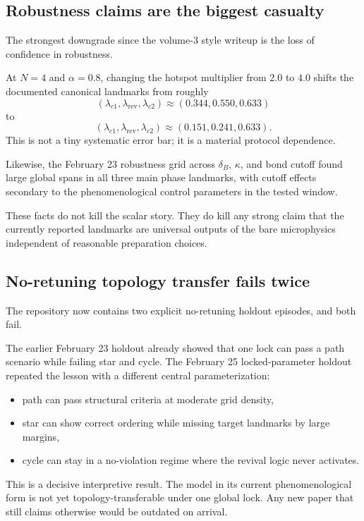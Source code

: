 \documentclass[11pt]{article}
\begin{document}
\subsection{Robustness claims are the biggest casualty}

The strongest downgrade since the volume-3 style writeup is the loss of confidence in robustness.

At $N=4$ and $\alpha=0.8$, changing the hotspot multiplier from $2.0$ to $4.0$ shifts the documented canonical landmarks from roughly
\[
(\lambda_{c1},\lambda_{\mathrm{rev}},\lambda_{c2})
\approx
(0.344,0.550,0.633)
\]
to
\[
(\lambda_{c1},\lambda_{\mathrm{rev}},\lambda_{c2})
\approx
(0.151,0.241,0.633).
\]
This is not a tiny systematic error bar; it is a material protocol dependence.

Likewise, the February 23 robustness grid across $\delta_B$, $\kappa$, and bond cutoff found large global spans in all three main phase landmarks, with cutoff effects secondary to the phenomenological control parameters in the tested window.

These facts do not kill the scalar story. They do kill any strong claim that the currently reported landmarks are universal outputs of the bare microphysics independent of reasonable preparation choices.

\subsection{No-retuning topology transfer fails twice}

The repository now contains two explicit no-retuning holdout episodes, and both fail.

The earlier February 23 holdout already showed that one lock can pass a path scenario while failing star and cycle. The February 25 locked-parameter holdout repeated the lesson with a different central parameterization:
\begin{itemize}
    \item path can pass structural criteria at moderate grid density,
    \item star can show correct ordering while missing target landmarks by large margins,
    \item cycle can stay in a no-violation regime where the revival logic never activates.
\end{itemize}

This is a decisive interpretive result. The model in its current phenomenological form is not yet topology-transferable under one global lock. Any new paper that still claims otherwise would be outdated on arrival.
\end{document}
